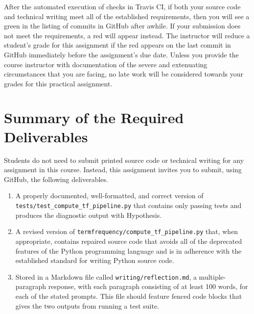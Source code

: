 \documentclass[11pt]{article}
\newcommand{\mainprogramsource}{\lstinline{termfrequency/compute_tf_pipeline.py}}
\newcommand{\testprogramsource}{\lstinline{tests/test_compute_tf_pipeline.py}}
\newcommand{\reflection}{\lstinline{writing/reflection.md}}
\newcommand{\checkmark}{\ding{51}}
\newcommand{\naughtmark}{\ding{55}}
\begin{document}
After the automated execution of checks in Travis CI, if both your source code
and technical writing meet all of the established requirements, then you will
see a green \checkmark{} in the listing of commits in GitHub after awhile. If
your submission does not meet the requirements, a red \naughtmark{} will appear
instead. The instructor will reduce a student's grade for this assignment if
the red \naughtmark{} appears on the last commit in GitHub immediately before
the assignment's due date. Unless you provide the course instructor with
documentation of the severe and extenuating circumstances that you are facing,
no late work will be considered towards your grades for this practical
assignment.

\section*{Summary of the Required Deliverables}

\noindent Students do not need to submit printed source code or technical
writing for any assignment in this course. Instead, this assignment invites you
to submit, using GitHub, the following deliverables.

\vspace*{-.25em}

\begin{enumerate}

\setlength{\itemsep}{0in}

\item A properly documented, well-formatted, and correct version of
  \testprogramsource{} that contains only passing tests and produces the
  diagnostic output with Hypothesis.


\item A revised version of \mainprogramsource{} that, when appropriate, contains
  repaired source code that avoids all of the deprecated features of the Python
  programming language and is in adherence with the established standard for
  writing Python source code.

\item Stored in a Markdown file called \reflection{}, a multiple-paragraph
  response, with each paragraph consisting of at least 100 words, for each of
  the stated prompts. This file should feature fenced code blocks that gives the
  two outputs from running a test suite.

\end{enumerate}
\end{document}
